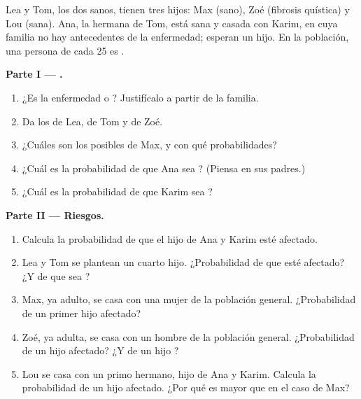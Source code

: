 \begin{problem}
\label{pb:g11:genes-and-disease:1}
Lea y Tom, los dos sanos, tienen tres hijos: Max (sano), Zoé (fibrosis
quística) y Lou (sana). Ana, la hermana de Tom, está sana y casada con
Karim, en cuya familia no hay antecedentes de la enfermedad; esperan un
hijo. En la población, una persona de cada 25 es .

\medskip
\noindent\textbf{Parte I --- .}
\begin{enumerate}
  \item ¿Es la enfermedad  o ? Justifícalo a partir de
        la familia.
  \item Da los  de Lea, de Tom y de Zoé.
  \item ¿Cuáles son los  posibles de Max, y con qué
        probabilidades?
  \item ¿Cuál es la probabilidad de que Ana sea ? (Piensa en
        sus padres.)
  \item ¿Cuál es la probabilidad de que Karim sea ?
\end{enumerate}

\medskip
\noindent\textbf{Parte II --- Riesgos.}
\begin{enumerate}[resume]
  \item Calcula la probabilidad de que el hijo de Ana y Karim esté
        afectado.
  \item Lea y Tom se plantean un cuarto hijo. ¿Probabilidad de que esté
        afectado? ¿Y de que sea ?
  \item Max, ya adulto, se casa con una mujer de la población general.
        ¿Probabilidad de un primer hijo afectado?
  \item Zoé, ya adulta, se casa con un hombre de la población general.
        ¿Probabilidad de un hijo afectado? ¿Y de un hijo ?
  \item Lou se casa con un primo hermano, hijo de Ana y Karim. Calcula
        la probabilidad de un hijo afectado. ¿Por qué es mayor que en
        el caso de Max?
\end{enumerate}


\end{problem}

